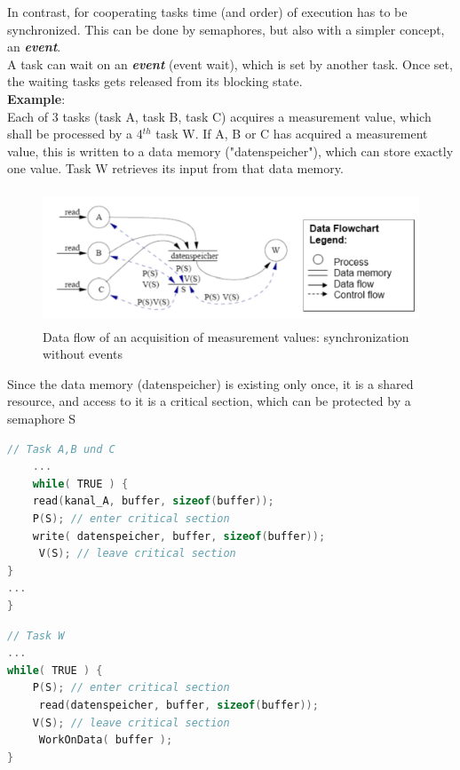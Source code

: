 In contrast, for cooperating tasks time (and order) of execution has to be synchronized. This can be done by semaphores, but also with a simpler concept, an \textbf{\textit{event}}.\\

A task can wait on an \textbf{\textit{event}} (event wait), which is set by another task. Once set, the waiting tasks gets released from its blocking state.\\

\textbf{Example}: \\
Each of 3 tasks (task A, task B, task C) acquires a measurement value, which shall be processed by a 4${}^{th}$ task W. If A, B or C has acquired a measurement value, this is written to a data memory ("datenspeicher"), which can store exactly one value. Task W retrieves its input from that data memory.

 	\begin{figure}[h]
    \centering
    \includegraphics[width=13cm, height=4cm]{Images/image111.png}
    \caption{Data flow of an acquisition of measurement values: synchronization without events}
    \label{fig:Fig }
    \end{figure}

Since the data memory (datenspeicher) is existing only once, it is a shared resource, and access to it is a critical section, which can be protected by a semaphore S\\

\begin{lstlisting}[style=mystyle, language=c]
// Task A,B und C
	...
	while( TRUE ) {
  	read(kanal_A, buffer, sizeof(buffer));
  	P(S); // enter critical section
  	write( datenspeicher, buffer, sizeof(buffer));
 	 V(S); // leave critical section
}
...
}
\end{lstlisting}

\begin{lstlisting}[style=mystyle, language=c]
// Task W
...
while( TRUE ) {
  	P(S); // enter critical section
 	 read(datenspeicher, buffer, sizeof(buffer));
  	V(S); // leave critical section
 	 WorkOnData( buffer );
}
\end{lstlisting}

